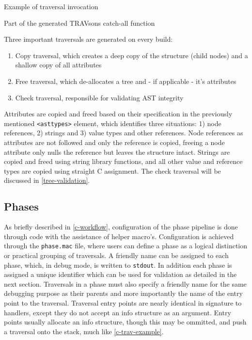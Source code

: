 \documentclass[twoside,openright]{uva-bachelor-thesis}
\newcommand{\code}[1]{\texttt{\footnotesize#1}}
\begin{document}
			\begin{codebox}[label=c-trav-example]{Example of traversal invocation}
			\end{codebox}
			
			\begin{codebox}[label=c-trav-sons]{Part of the generated TRAVsons catch-all function}
			\end{codebox}
			
			Three important traversals are generated on every build:
			\begin{enumerate}
				\item Copy traversal, which creates a deep copy of the structure (child nodes) and a shallow copy of all attributes
				\item Free traversal, which de-allocates a tree and - if applicable - it's attributes
				\item Check traversal, responsible for validating AST integrity
			\end{enumerate}
			
			Attributes are copied and freed based on their specification in the previously mentioned \code{<asttypes>} element, which identifies three situations: 1) node references, 2) strings and 3) value types and other references. Node references as attributes are not followed and only the reference is copied, freeing a node attribute only nulls the reference but leaves the structure intact. Strings are copied and freed using string library functions, and all other value and reference types are copied using straight C assignment. The check traversal will be discussed in \cref{tree-validation}.
					
		\subsection{Phases}
			As briefly described in \cref{c-workflow}, configuration of the phase pipeline is done through code with the assistance of helper macro's. Configuration is achieved through the \code{phase.mac} file, where users can define a phase as a logical distinction or practical grouping of traversals. A friendly name can be assigned to each phase, which, in debug mode, is written to \code{stdout}. In addition each phase is assigned a unique identifier which can be used for validation as detailed in the next section. Traversals in a phase must also specify a friendly name for the same debugging purpose as their parents and more importantly the name of the entry point to the traversal. Traversal entry points are nearly identical in signature to handlers, except they do not accept an info structure as an argument. Entry points usually allocate an info structure, though this may be ommitted, and push a traversal onto the stack, much like \cref{c-trav-example}.
			
\end{document}
